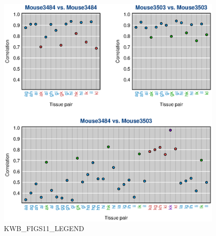 \documentclass[letterpaper,twoside]{article}
\begin{document}
\begin{figure}[p]
\centerline{\includegraphics{SuppFigs/figS11.eps}}

\caption{KWB_FIGS11_LEGEND}
\end{figure}


\clearpage
\end{document}
